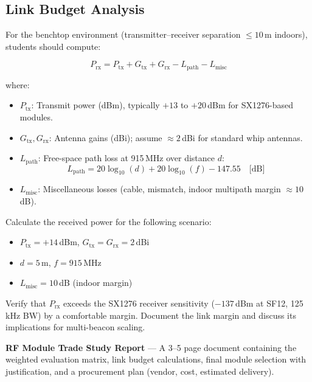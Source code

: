 \documentclass[11pt,letterpaper]{article}
\begin{document}
	\subsection{Link Budget Analysis}
	
	For the benchtop environment (transmitter--receiver separation $\leq 10$\,m indoors), students should compute:
	
	\begin{equation}
		P_{\text{rx}} = P_{\text{tx}} + G_{\text{tx}} + G_{\text{rx}} - L_{\text{path}} - L_{\text{misc}}
		\label{eq:linkbudget}
	\end{equation}
	
	where:
	\begin{itemize}[leftmargin=2em]
		\item $P_{\text{tx}}$: Transmit power (dBm), typically $+13$ to $+20$\,dBm for SX1276-based modules.
		\item $G_{\text{tx}}, G_{\text{rx}}$: Antenna gains (dBi); assume $\approx 2$\,dBi for standard whip antennas.
		\item $L_{\text{path}}$: Free-space path loss at 915\,MHz over distance $d$:
		\begin{equation}
			L_{\text{path}} = 20\log_{10}(d) + 20\log_{10}(f) - 147.55 \quad \text{[dB]}
		\end{equation}
		\item $L_{\text{misc}}$: Miscellaneous losses (cable, mismatch, indoor multipath margin $\approx 10$\,dB).
	\end{itemize}
	
	\begin{tcolorbox}[infobox={Exercise: Link Budget Worksheet}]
		Calculate the received power for the following scenario:
		\begin{itemize}
			\item $P_{\text{tx}} = +14$\,dBm, $G_{\text{tx}} = G_{\text{rx}} = 2$\,dBi
			\item $d = 5$\,m, $f = 915$\,MHz
			\item $L_{\text{misc}} = 10$\,dB (indoor margin)
		\end{itemize}
		Verify that $P_{\text{rx}}$ exceeds the SX1276 receiver sensitivity ($-137$\,dBm at SF12, 125\,kHz BW) by a comfortable margin. Document the link margin and discuss its implications for multi-beacon scaling.
	\end{tcolorbox}
	
	\begin{tcolorbox}[deliverable={Week 1 Deliverable}]
		\textbf{RF Module Trade Study Report} --- A 3--5 page document containing the weighted evaluation matrix, link budget calculations, final module selection with justification, and a procurement plan (vendor, cost, estimated delivery).
	\end{tcolorbox}
	
\end{document}

